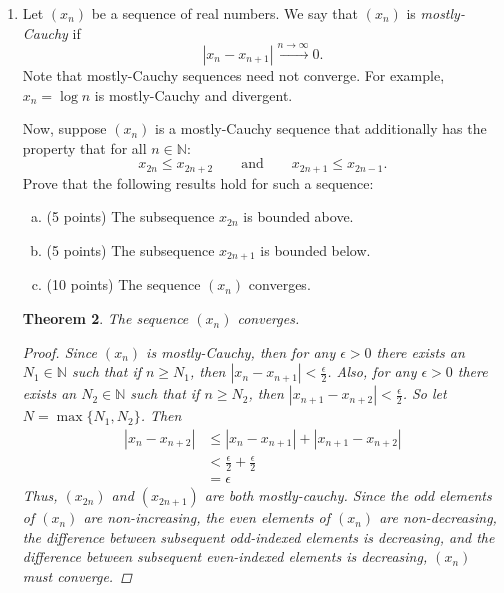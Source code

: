 \documentclass{amsart}
\newtheorem{theorem}{Theorem}
\begin{document}
\begin{enumerate}[1.]
\begin{theorem}
\begin{proof}
		Case 1: $\exists r > 0$ such that $N_r(a) \subseteq A$. Since $a \in N_r(a)$, then $a \in A$. \\
		
		Case 2: $\nexists r > 0$ such that $N_r(a) \subseteq A$. Then for all $r > 0$, $N_r(a)$ contains at least one element 
		that is not contained in $A$. Thus, $N_r(a) \cap A^c \neq \phi$. But $a$ is also a limit point, so we know that
		for all $r > 0$, $N_r(a) \cap A \neq \phi$. Thus $a \in e(A)$, and since $e(A) \subseteq A$, then $x \in A$.

		In both cases, $a \in A$. By universal generalization, $A$ contains all of its limit points. Therefore $A$ is closed.
	\end{proof}
\end{theorem}
\newpage
\item Let $(x_n)$ be a sequence of real numbers. We say that $(x_n)$ is \emph{mostly-Cauchy} if
\[ |x_n - x_{n+1}| \xrightarrow{n \to \infty} 0.\]
Note that mostly-Cauchy sequences need not converge. For example, $x_n=\log n$ is mostly-Cauchy and divergent.

Now, suppose $(x_n)$ is a mostly-Cauchy sequence that additionally has the property that for all $n \in \mathbb{N}$:
\[ x_{2n} \leq x_{2n+2} \qquad \text{and} \qquad x_{2n+1} \leq x_{2n-1}.\]
Prove that the following results hold for such a sequence:
\begin{enumerate}[(a)]
	\item (5 points) The subsequence $x_{2n}$ is bounded above.
	\item (5 points) The subsequence $x_{2n+1}$ is bounded below.
	\item (10 points) The sequence $(x_n)$ converges.
\end{enumerate}
\begin{theorem} 
	The sequence $(x_n)$ converges.
	\begin{proof}
		Since $(x_n)$ is mostly-Cauchy, then for any $\epsilon > 0$ there exists an $N_1 \in \mathbb{N}$ such that if $n \geq N_1$, 
		then $|x_n - x_{n+1}| < \frac{\epsilon}{2}$. Also, for any $\epsilon > 0$ there exists an $N_2 \in \mathbb{N}$ such that if $n \geq N_2$, 
		then $|x_{n+1} - x_{n+2}| < \frac{\epsilon}{2}$. So let $N = \max\{N_1, N_2\}$. Then
		\begin{align*}
			|x_n - x_{n+2}| &\leq |x_n - x_{n+1}| + |x_{n+1} - x_{n+2}| \\
			&< \frac{\epsilon}{2} + \frac{\epsilon}{2} \\
			&= \epsilon
		\end{align*}
		Thus, $(x_{2n})$ and $(x_{2n+1})$ are both mostly-cauchy. Since the odd elements of $(x_n)$ are non-increasing, the even elements of $(x_n)$ are non-decreasing, 
		the difference between subsequent odd-indexed elements is decreasing, and the difference between subsequent even-indexed elements is decreasing, $(x_n)$ must converge.
	\end{proof}
\end{theorem}
\end{enumerate}
\end{document}
